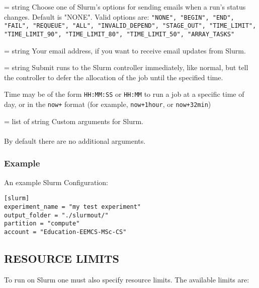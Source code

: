 \documentclass[a4paper,english]{article}
\begin{document}
\begin{adjustwidth}{18pt}{0pt}
\begin{Description}[Options]
              \item[\Opt{mail\_type} = string]        
                Choose one of Slurm's options for sending emails when a run's status changes.
                Default is "NONE". Valid options are: 
                \texttt{"NONE", "BEGIN", "END", "FAIL", "REQUEUE", "ALL", "INVALID\_DEPEND", "STAGE\_OUT", "TIME\_LIMIT", "TIME\_LIMIT\_90", "TIME\_LIMIT\_80", "TIME\_LIMIT\_50", "ARRAY\_TASKS"}
              \item[\Opt{mail\_user} = string]        
                Your email address, if you want to receive email updates from Slurm.
              \item[\Opt{begin} = string]        
                Submit runs to the Slurm controller immediately, like normal, but tell the 
                controller to defer the allocation of the job until the specified time.

                Time may be of the form \texttt{HH:MM:SS} or \texttt{HH:MM} to run a job at a specific time of day,
                or in the \texttt{now+} format (for example, \texttt{now+1hour}, or \texttt{now+32min})
              \item[\Opt{additional\_args?} = list of string]
                Custom arguments for Slurm. \\ \\
                By default there are no additional arguments.
          \end{Description}

          \subsubsection{Example}
              An example Slurm Configuration:

              \begin{verbatim}
[slurm]
experiment_name = "my test experiment"
output_folder = "./slurmout/"
partition = "compute"
account = "Education-EEMCS-MSc-CS"
              \end{verbatim}

      \subsection{RESOURCE LIMITS}

          To run on Slurm one must also specify resource limits.
          The available limits are:


\end{adjustwidth}
\end{document}
